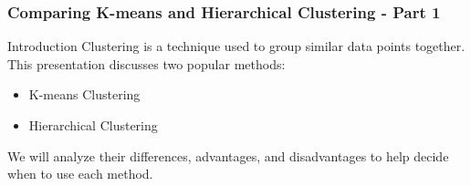 \documentclass[aspectratio=169]{beamer}
\begin{document}
\begin{frame}[fragile]
    \frametitle{Comparing K-means and Hierarchical Clustering - Part 1}
    \begin{block}{Introduction}
        Clustering is a technique used to group similar data points together. This presentation discusses two popular methods:
        \begin{itemize}
            \item K-means Clustering
            \item Hierarchical Clustering
        \end{itemize}
        We will analyze their differences, advantages, and disadvantages to help decide when to use each method.
    \end{block}
\end{frame}
\end{document}
